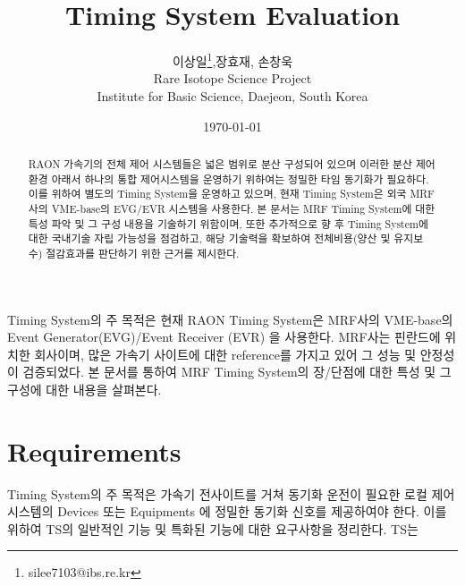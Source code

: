 \documentclass[11pt
  , a4paper
  , article
  , oneside
]{memoir}
\begin{document}
\newcommand{\technumber}{
  RAON Control-Document Series\\
  Revision : v1.0,   Release : 2016-03-14 fixed date}
\title{\textbf{Timing System Evaluation}}

\author{이상일\thanks{silee7103@ibs.re.kr},장효재, 손창욱 \\

  Rare Isotope Science Project\\
  Institute for Basic Science, Daejeon, South Korea
}
\date{\today}

\renewcommand{\maketitlehooka}{\begin{flushright}\textsf{\technumber}\end{flushright}}

\maketitle

\begin{abstract}
RAON 가속기의 전체 제어 시스템들은 넓은 범위로 분산 구성되어 있으며 이러한 분산 제어환경 아래서 하나의 통합 제어시스템을 운영하기 위하여는 정밀한 타임 동기화가 필요하다. 이를 위하여 별도의 Timing System을 운영하고 있으며, 현재 Timing System은 외국 MRF 사의 VME-base의 EVG/EVR 시스템을 사용한다. 본 문서는 MRF Timing System\cite{mrf}에 대한 특성 파악 및 그 구성 내용을 기술하기 위함이며, 또한 추가적으로 향 후 Timing System에 대한 국내기술 자립 가능성을 점검하고, 해당 기술력을 확보하여 전체비용(양산 및 유지보수) 절감효과를 판단하기 위한 근거를 제시한다.
\end{abstract}
Timing System의 주 목적은 
현재 RAON Timing System은 MRF사의 VME-base의 Event Generator(EVG)\cite{evg}/Event Receiver (EVR)\cite{evr} 을 사용한다. MRF사는 핀란드에 위치한 회사이며, 많은 가속기 사이트에 대한 reference를 가지고 있어 그 성능 및 안정성이 검증되었다. 본 문서를 통하여 MRF Timing System의 장/단점에 대한 특성 및 그 구성에 대한 내용을 살펴본다.


\chapter{Requirements}
Timing System의 주 목적은 가속기 전사이트를 거쳐 동기화 운전이 필요한 로컬 제어시스템의 Devices 또는 Equipments 에 정밀한 동기화 신호를 제공하여야 한다. 이를 위하여 TS의 일반적인 기능 및 특화된 기능에 대한 요구사항을 정리한다. TS는 
\end{document}
